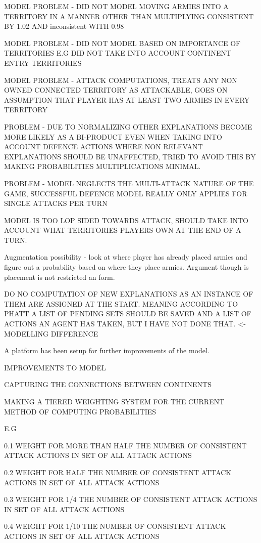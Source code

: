 \documentclass[parskip]{cs4rep}
\begin{document}
MODEL PROBLEM - DID NOT MODEL MOVING ARMIES INTO A TERRITORY IN A MANNER OTHER THAN MULTIPLYING CONSISTENT BY 1.02 AND inconsistent WITH 0.98

MODEL PROBLEM - DID NOT MODEL BASED ON IMPORTANCE OF TERRITORIES E.G DID NOT TAKE INTO ACCOUNT CONTINENT ENTRY TERRITORIES

MODEL PROBLEM - ATTACK COMPUTATIONS, TREATS ANY NON OWNED CONNECTED TERRITORY AS ATTACKABLE, GOES ON ASSUMPTION THAT PLAYER HAS AT LEAST TWO ARMIES IN EVERY TERRITORY

PROBLEM - DUE TO NORMALIZING OTHER EXPLANATIONS BECOME MORE LIKELY AS A BI-PRODUCT EVEN WHEN TAKING INTO ACCOUNT DEFENCE ACTIONS WHERE NON RELEVANT EXPLANATIONS SHOULD BE UNAFFECTED, TRIED TO AVOID THIS BY MAKING PROBABILITIES MULTIPLICATIONS MINIMAL.

PROBLEM - MODEL NEGLECTS THE MULTI-ATTACK NATURE OF THE GAME, SUCCESSFUL DEFENCE MODEL REALLY ONLY APPLIES FOR SINGLE ATTACKS PER TURN

MODEL IS TOO LOP SIDED TOWARDS ATTACK, SHOULD TAKE INTO ACCOUNT WHAT TERRITORIES PLAYERS OWN AT THE END OF A TURN.

Augmentation possibility - look at where player has already placed armies and figure out a probability based on where they place armies. Argument though is placement is not restricted an form.

DO NO COMPUTATION OF NEW EXPLANATIONS AS AN INSTANCE OF THEM ARE ASSIGNED AT THE START. MEANING ACCORDING TO PHATT A LIST OF PENDING SETS SHOULD BE SAVED AND A LIST OF ACTIONS AN AGENT HAS TAKEN, BUT I HAVE NOT DONE THAT. <- MODELLING DIFFERENCE

A platform has been setup for further improvements of the model.

IMPROVEMENTS TO MODEL

CAPTURING THE CONNECTIONS BETWEEN CONTINENTS

MAKING A TIERED WEIGHTING SYSTEM FOR THE CURRENT METHOD OF COMPUTING PROBABILITIES

E.G 

0.1 WEIGHT FOR MORE THAN HALF THE NUMBER OF CONSISTENT ATTACK ACTIONS IN SET OF ALL ATTACK ACTIONS

0.2 WEIGHT FOR HALF THE NUMBER OF CONSISTENT ATTACK ACTIONS IN SET OF ALL ATTACK ACTIONS

0.3 WEIGHT FOR 1/4 THE NUMBER OF CONSISTENT ATTACK ACTIONS IN SET OF ALL ATTACK ACTIONS

0.4 WEIGHT FOR 1/10 THE NUMBER OF CONSISTENT ATTACK ACTIONS IN SET OF ALL ATTACK ACTIONS
\end{document}

